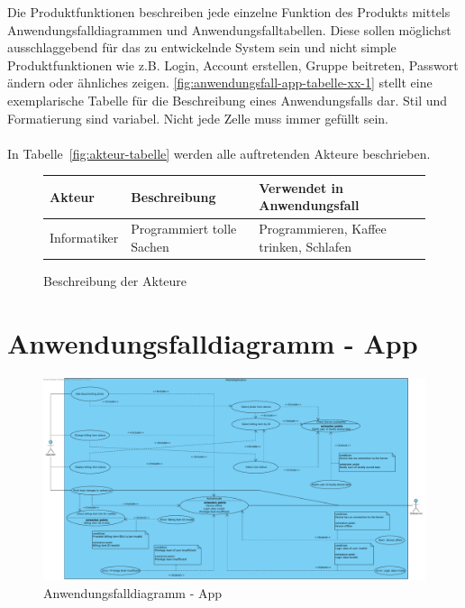 \begin{tcolorbox}
Die Produktfunktionen beschreiben jede einzelne Funktion des Produkts mittels Anwendungsfalldiagrammen und Anwendungsfalltabellen.
Diese sollen möglichst ausschlaggebend für das zu entwickelnde System sein und nicht simple Produktfunktionen wie z.B. Login, Account erstellen, Gruppe beitreten, Passwort ändern oder ähnliches zeigen.
\autoref{fig:anwendungsfall-app-tabelle-xx-1} stellt eine exemplarische Tabelle für die Beschreibung eines Anwendungsfalls dar. Stil und Formatierung sind variabel. Nicht jede Zelle muss immer gefüllt sein.
\\\\
In  Tabelle~\autoref{fig:akteur-tabelle} werden alle auftretenden Akteure beschrieben.


\end{tcolorbox}

\begin{figure}[h]
	\centering
	
	\begin{tabularx}{\textwidth}{ p{} | p{} | X }
		\textbf{Akteur} & \textbf{Beschreibung} & \textbf{Verwendet in Anwendungsfall} \\ \hline
		Informatiker & Programmiert tolle Sachen & Programmieren, Kaffee trinken, Schlafen
	\end{tabularx}
	
	\caption{Beschreibung der Akteure}
	\label{fig:akteur-tabelle}
\end{figure}

\newpage

\section{Anwendungsfalldiagramm - App}

\begin{figure}[h]
	\centering
    \includegraphics[width=\linewidth]{img/diagrams/Mobile_Application.pdf}
	\caption{Anwendungsfalldiagramm - App}
	\label{fig:anwendungsfalldiagramm-app}
\end{figure}

